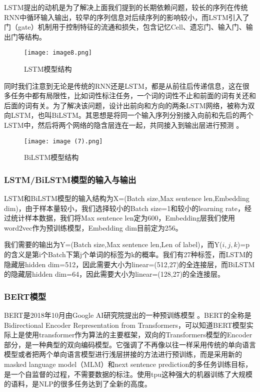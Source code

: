 \documentclass{article}
\begin{document}
LSTM提出的动机是为了解决上面我们提到的长期依赖问题，较长的序列在传统RNN中循环输入输出，较早的序列信息对后续序列的影响较小，而LSTM引入了门（gate）机制用于控制特征的流通和损失，包含记忆Cell、遗忘门、输入门、输出门等结构\cite{schmidhuber2002learning}。

\begin{figure}[H]
	\centering
    \texttt{[image: image8.png]}
    \caption{LSTM模型结构}
    \label{fig:LSTM}
\end{figure}

同时我们注意到无论是传统的RNN还是LSTM，都是从前往后传递信息，这在很多任务中都有局限性，比如词性标注任务，一个词的词性不止和前面的词有关还和后面的词有关。为了解决该问题，设计出前向和方向的两条LSTM网络，被称为双向LSTM，也叫BiLSTM。其思想是将同一个输入序列分别接入向前和先后的两个LSTM中，然后将两个网络的隐含层连在一起，共同接入到输出层进行预测\cite{huang2015bidirectional} 。

\begin{figure}[H]
	\centering
    \texttt{[image: image (7).png]}
    \caption{BiLSTM模型结构}
    \label{fig:BiLSTM}
\end{figure}

\subsubsection{LSTM/BiLSTM模型的输入与输出}
LSTM和BiLSTM模型的输入结构为X=(Batch size,Max sentence len,Embedding dim)，由于样本量较小，我们选择较小的Batch size=1和较小的learning rate，经过统计样本数据，我们将Max sentence len定为600，Embedding层我们使用word2vec作为预训练模型，Embedding dim目前定为256。

我们需要的输出为Y=(Batch size,Max sentence len,Len of label)，而Y($i,j,k$)=p的含义是第i个Batch下第j个单词的标签为k的概率。我们有27种标签，而LSTM的隐藏层hidden dim=512，因此需要大小为linear=(512,27)的全连接层，而BiLSTM的隐藏层hidden dim=64，因此需要大小为linear=(128,27)的全连接层。

\subsubsection{BERT模型}
BERT是2018年10月由Google AI研究院提出的一种预训练模型\cite{devlin2018bert} 。BERT的全称是Bidirectional Encoder Representation from Transformers，可以知道BERT模型实际上是使用transformer作为算法的主要框架，双向的Transformers模型的Encoder部分，是一种典型的双向编码模型。它强调了不再像以往一样采用传统的单向语言模型或者把两个单向语言模型进行浅层拼接的方法进行预训练，而是采用新的masked language model（MLM）和next sentence prediction的多任务训练目标，是一个自监督的过程，不需要数据的标注。使用tpu这种强大的机器训练了大规模的语料，是NLP的很多任务达到了全新的高度。
\end{document}
